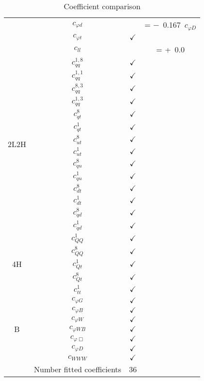 \documentclass{article}
\begin{document}
\begin{table}[H]
\begin{tabular}{|c|c|c|c|}
 & $c_{\varphi d}$ & & = $-$\ 0.167\ $c_{\varphi D}$\\ \cline{2-4}
 & $c_{\varphi t}$ & $\checkmark$ & \\ \cline{2-4}
 & $c_{ll}$ & & = +\ 0.0
\\ \hline
\multirow{14}{*}{2L2H}
 & $c_{qq}^{1,8}$ & $\checkmark$ & \\ \cline{2-4}
 & $c_{qq}^{1,1}$ & $\checkmark$ & \\ \cline{2-4}
 & $c_{qq}^{8,3}$ & $\checkmark$ & \\ \cline{2-4}
 & $c_{qq}^{1,3}$ & $\checkmark$ & \\ \cline{2-4}
 & $c_{qt}^{8}$ & $\checkmark$ & \\ \cline{2-4}
 & $c_{qt}^{1}$ & $\checkmark$ & \\ \cline{2-4}
 & $c_{ut}^{8}$ & $\checkmark$ & \\ \cline{2-4}
 & $c_{ut}^{1}$ & $\checkmark$ & \\ \cline{2-4}
 & $c_{qu}^{8}$ & $\checkmark$ & \\ \cline{2-4}
 & $c_{qu}^{1}$ & $\checkmark$ & \\ \cline{2-4}
 & $c_{dt}^{8}$ & $\checkmark$ & \\ \cline{2-4}
 & $c_{dt}^{1}$ & $\checkmark$ & \\ \cline{2-4}
 & $c_{qd}^{8}$ & $\checkmark$ & \\ \cline{2-4}
 & $c_{qd}^{1}$ & $\checkmark$ & 
\\ \hline
\multirow{5}{*}{4H}
 & $c_{QQ}^{1}$ & $\checkmark$ & \\ \cline{2-4}
 & $c_{QQ}^{8}$ & $\checkmark$ & \\ \cline{2-4}
 & $c_{Qt}^{1}$ & $\checkmark$ & \\ \cline{2-4}
 & $c_{Qt}^{8}$ & $\checkmark$ & \\ \cline{2-4}
 & $c_{tt}^{1}$ & $\checkmark$ & 
\\ \hline
\multirow{7}{*}{B}
 & $c_{\varphi G}$ & $\checkmark$ & \\ \cline{2-4}
 & $c_{\varphi B}$ & $\checkmark$ & \\ \cline{2-4}
 & $c_{\varphi W}$ & $\checkmark$ & \\ \cline{2-4}
 & $c_{\varphi WB}$ & $\checkmark$ & \\ \cline{2-4}
 & $c_{\varphi \Box}$ & $\checkmark$ & \\ \cline{2-4}
 & $c_{\varphi D}$ & $\checkmark$ & \\ \cline{2-4}
 & $c_{WWW}$ & $\checkmark$ & 
\\ \hline
\hline & Number fitted coefficients & 36 &  \\ \hline
\end{tabular}
\caption{Coefficient comparison}
\end{table}
\end{document}
